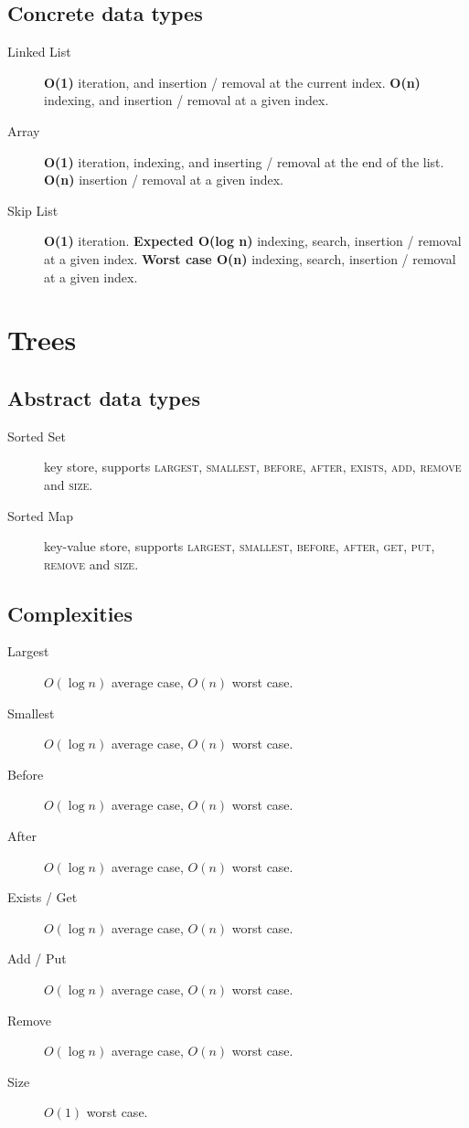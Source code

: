 \documentclass[landscape]{cheat}
\begin{document}
\begin{multicols}{3}
\subsection{Concrete data types}
\begin{description}
    \item[Linked List]
        \textbf{O(1)} iteration, and insertion / removal at the current index.
        \textbf{O(n)} indexing, and insertion / removal at a given index.
    \item[Array]
        \textbf{O(1)} iteration, indexing, and inserting / removal at the end of the list.
        \textbf{O(n)} insertion / removal at a given index.
    \item[Skip List]
        \textbf{O(1)} iteration.
        \textbf{Expected O(log n)} indexing, search, insertion / removal at a given index.
        \textbf{Worst case O(n)} indexing, search, insertion / removal at a given index.
\end{description}

\section{Trees}

\subsection{Abstract data types}
\begin{description}
    \item[Sorted Set]
        key store,
        supports \textsc{largest}, \textsc{smallest}, \textsc{before}, \textsc{after},
        \textsc{exists}, \textsc{add}, \textsc{remove} and \textsc{size}.
    \item[Sorted Map]
        key-value store,
        supports \textsc{largest}, \textsc{smallest}, \textsc{before}, \textsc{after},
        \textsc{get}, \textsc{put}, \textsc{remove} and \textsc{size}.
\end{description}

\subsection{Complexities}
\begin{description}
    \item[Largest] $O(\log n)$ average case, $O(n)$ worst case.
    \item[Smallest] $O(\log n)$ average case, $O(n)$ worst case.
    \item[Before] $O(\log n)$ average case, $O(n)$ worst case.
    \item[After] $O(\log n)$ average case, $O(n)$ worst case.
    \item[Exists / Get] $O(\log n)$ average case, $O(n)$ worst case.
    \item[Add / Put] $O(\log n)$ average case, $O(n)$ worst case.
    \item[Remove] $O(\log n)$ average case, $O(n)$ worst case.
    \item[Size] $O(1)$ worst case.
\end{description}


\end{multicols}
\end{document}
